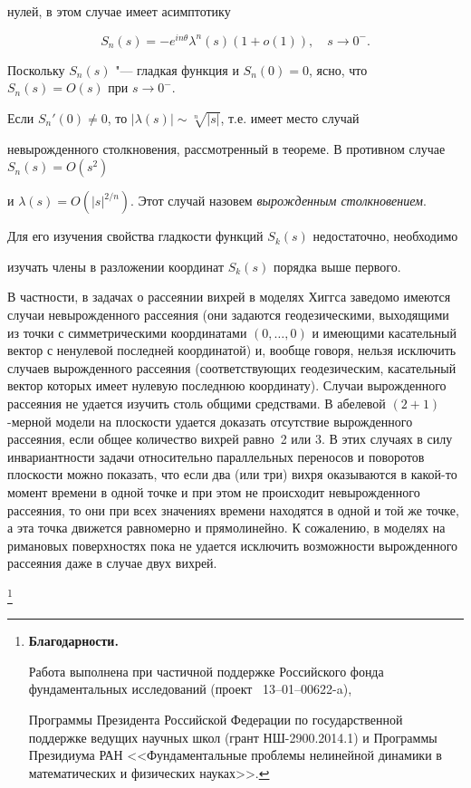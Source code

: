 нулей, в этом случае имеет асимптотику 

$$S_n(s)=-e^{in\theta}\lambda^n(s)(1+o(1)),\quad s\to0^-.$$

Поскольку $S_n(s)$ "---  гладкая функция и $S_n(0)=0$, ясно, что $S_n(s)=O(s)$ при $s\to0^-$.

Если $S_n'(0)\neq0$, то $|\lambda(s)|\sim\sqrt[n]{|s|}$, т.е. имеет место случай 

невырожденного столкновения, рассмотренный в теореме. В противном случае $S_n(s)=O(s^2)$ 

и $\lambda(s)=O(|s|^{2/n})$. Этот случай назовем \textit{вырожденным столкновением}.

Для его изучения свойства гладкости функций $S_k(s)$ недостаточно, необходимо

изучать члены в разложении координат $S_k(s)$ порядка выше первого. 



В частности, в задачах о рассеянии вихрей в моделях Хиггса заведомо имеются случаи невырожденного рассеяния (они задаются геодезическими, выходящими из точки с симметрическими координатами $(0,\dots, 0)$ и имеющими касательный вектор с ненулевой последней координатой) и, вообще говоря, нельзя исключить случаев вырожденного рассеяния (соответствующих геодезическим, касательный вектор которых имеет нулевую последнюю координату). Случаи вырожденного рассеяния не удается изучить столь общими средствами. В абелевой $(2+1)$-мерной модели на плоскости удается доказать отсутствие вырожденного рассеяния, если общее количество вихрей равно~2 или 3. В этих случаях в силу инвариантности задачи относительно параллельных переносов и поворотов плоскости можно показать, что если два (или три) вихря оказываются в какой-то момент времени в одной точке и при этом не происходит невырожденного рассеяния, то они при всех значениях времени находятся в одной и той же точке, а эта точка движется равномерно и прямолинейно. К сожалению, в моделях на римановых поверхностях пока не удается исключить возможности вырожденного рассеяния даже в случае двух вихрей.







\thanks{

\textbf{Благодарности.}

Работа выполнена при частичной поддержке Российского фонда фундаментальных исследований (проект \No~13--01--00622-a),

Программы Президента Российской Федерации по государственной поддержке ведущих научных школ (грант НШ-2900.2014.1) и Программы Президиума РАН <<Фундаментальные проблемы нелинейной динамики в математических и физических науках>>.}



